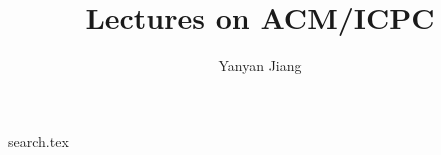\documentclass[11pt]{book}
\begin{document}
\title{\Huge \hei \bf Lectures on ACM/ICPC}
\author{Yanyan Jiang}
\date{}

{search.tex}
\end{document}
